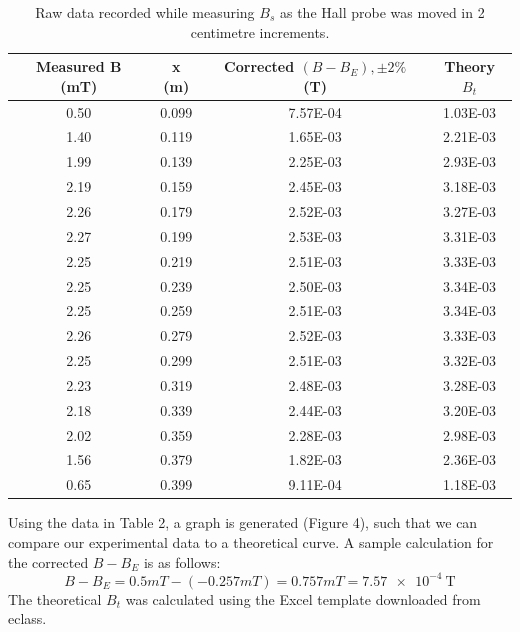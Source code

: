 \documentclass[letterpaper]{article}
\begin{document}
\begin{table}[]
\centering
\begin{tabular}{|c|c|c|c|}
\hline
Measured B (mT) & x (m) & Corrected  $(B - B_E),\pm 2\%$ (T) & Theory $B_t$ \\ \hline
0.50            & 0.099 & 7.57E-04                           & 1.03E-03     \\ \hline
1.40            & 0.119 & 1.65E-03                           & 2.21E-03     \\ \hline
1.99            & 0.139 & 2.25E-03                           & 2.93E-03     \\ \hline
2.19            & 0.159 & 2.45E-03                           & 3.18E-03     \\ \hline
2.26            & 0.179 & 2.52E-03                           & 3.27E-03     \\ \hline
2.27            & 0.199 & 2.53E-03                           & 3.31E-03     \\ \hline
2.25            & 0.219 & 2.51E-03                           & 3.33E-03     \\ \hline
2.25            & 0.239 & 2.50E-03                           & 3.34E-03     \\ \hline
2.25            & 0.259 & 2.51E-03                           & 3.34E-03     \\ \hline
2.26            & 0.279 & 2.52E-03                           & 3.33E-03     \\ \hline
2.25            & 0.299 & 2.51E-03                           & 3.32E-03     \\ \hline
2.23            & 0.319 & 2.48E-03                           & 3.28E-03     \\ \hline
2.18            & 0.339 & 2.44E-03                           & 3.20E-03     \\ \hline
2.02            & 0.359 & 2.28E-03                           & 2.98E-03     \\ \hline
1.56            & 0.379 & 1.82E-03                           & 2.36E-03     \\ \hline
0.65            & 0.399 & 9.11E-04                           & 1.18E-03     \\ \hline
\end{tabular}
\caption{Raw data recorded while measuring $B_s$ as the Hall probe was moved in 2 centimetre increments.}
\end{table}

Using the data in Table 2, a graph is generated (Figure 4), such that we can compare our
experimental data to a theoretical curve. A sample calculation for the corrected $B-B_E$
is as follows:
$$ B-B_E = 0.5 mT - (-0.257 mT) = 0.757 mT = \SI{7.57e-4}{\tesla}$$
The theoretical $B_t$ was calculated using the Excel template downloaded from eclass.
\end{document}
